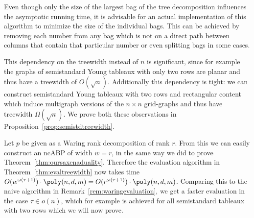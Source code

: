 \begin{remark}
    Even though only the size of the largest bag of the tree decomposition influences the asymptotic running time, it is advisable for an actual implementation of this algorithm to minimize the size of the individual bags.
    This can be achieved by removing each number from any bag which is not on a direct path between columns that contain that particular number or even splitting bags in some cases.
\end{remark}

This dependency on the treewidth instead of $n$ is significant, since for example the graphs of semistandard Young tableaux with only two rows are planar and thus have a treewidth of $O(\sqrt{n})$.
Additionally this dependency is tight: we can construct semistandard Young tableaux with two rows and rectangular content which induce multigraph versions of the $n \times n$ grid-graphs and thus have treewidth $\Omega(\sqrt{n})$.
We prove both these observations in Proposition~\ref{prop:semistdtreewidth}.

Let $p$ be given as a Waring rank decomposition of rank $r$.
From this we can easily construct an ncABP of width $w=r$, in the same way we did to prove Theorem~\ref{thm:oursaxenaduality}.
Therefore the evaluation algorithm in Theorem~\ref{thm:evaltreewidth} now takes time $O(w^{\omega(\tau+1)}) \cdot \poly(n,d,m) = O(r^{\omega(\tau+1)}) \cdot \poly(n,d,m)$.
Comparing this to the naive algorithm in Remark~\ref{rem:waringevaluation}, we get a faster evaluation in the case $\tau \in o(n)$, which for example is achieved for all semistandard tableaux with two rows which we will now prove.

